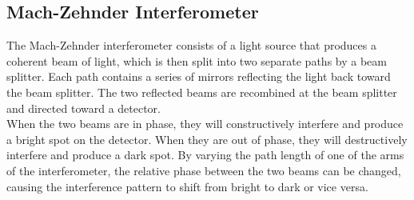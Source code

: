 \subsection{Mach-Zehnder Interferometer}
The Mach-Zehnder interferometer consists of a light source that produces a coherent beam of light, which is then split into two separate paths by a beam splitter. Each path contains a series of mirrors reflecting the light back toward the beam splitter. The two reflected beams are recombined at the beam splitter and directed toward a detector.\\
When the two beams are in phase, they will constructively interfere and produce a bright spot on the detector. When they are out of phase, they will destructively interfere and produce a dark spot. By varying the path length of one of the arms of the interferometer, the relative phase between the two beams can be changed, causing the interference pattern to shift from bright to dark or vice versa.

